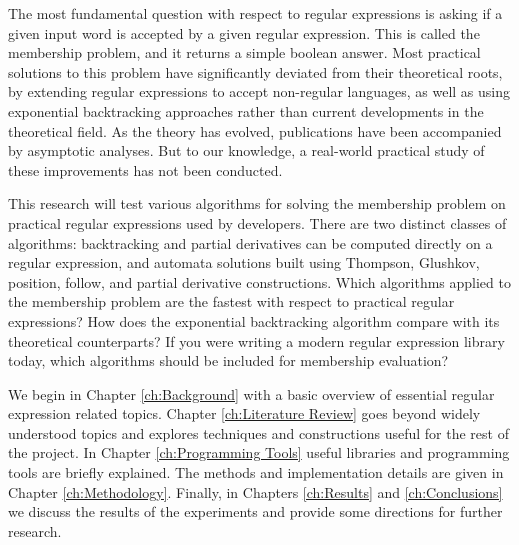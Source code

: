 The most fundamental question with respect to regular expressions is asking if a given input word is accepted by a given regular expression. This is called the membership problem, and it returns a simple boolean answer. Most practical solutions to this problem have significantly deviated from their theoretical roots, by extending regular expressions to accept non-regular languages, as well as using exponential backtracking approaches rather than current developments in the theoretical field. As the theory has evolved, publications have been accompanied by asymptotic analyses. But to our knowledge, a real-world practical study of these improvements has not been conducted.

This research will test various algorithms for solving the membership problem on practical regular expressions used by developers. There are two distinct classes of algorithms: backtracking and partial derivatives can be computed directly on a regular expression, and automata solutions built using Thompson, Glushkov, position, follow, and partial derivative constructions. Which algorithms applied to the membership problem are the fastest with respect to practical regular expressions? How does the exponential backtracking algorithm compare with its theoretical counterparts? If you were writing a modern regular expression library today, which algorithms should be included for membership evaluation?

We begin in Chapter \ref{ch:Background} with a basic overview of essential regular expression related topics. Chapter \ref{ch:Literature Review} goes beyond widely understood topics and explores techniques and constructions useful for the rest of the project. In Chapter \ref{ch:Programming Tools} useful libraries and programming tools are briefly explained. The methods and implementation details are given in Chapter \ref{ch:Methodology}. Finally, in Chapters \ref{ch:Results} and \ref{ch:Conclusions} we discuss the results of the experiments and provide some directions for further research.